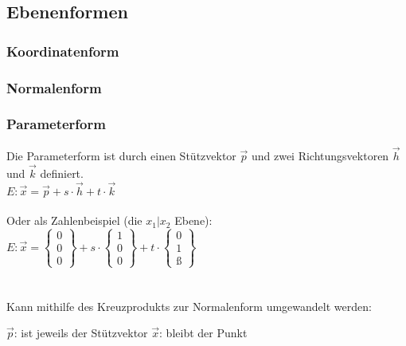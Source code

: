 \subsection{Ebenenformen}
\subsubsection{Koordinatenform}
\subsubsection{Normalenform}
\subsubsection{Parameterform}
Die Parameterform ist durch einen Stützvektor $\vec{p}$ und zwei Richtungsvektoren $\vec{h}$ und $\vec{k}$ definiert. \\
$
E: \vec{x} = \vec{p} + s\cdot\vec{h} + t\cdot\vec{k}
$
\\\\
Oder als Zahlenbeispiel (die $x_1 | x_2$ Ebene): \\
$
E: \vec{x} = 
\begin{Bmatrix}
    0 \\ 0 \\ 0
\end{Bmatrix}
 + s \cdot
\begin{Bmatrix}
    1 \\ 0 \\ 0
\end{Bmatrix}
 + t \cdot 
 \begin{Bmatrix}
    0 \\ 1 \\ ß
 \end{Bmatrix}
$
\\\\\\
Kann mithilfe des Kreuzprodukts zur Normalenform umgewandelt werden: \\
\begin{itemize}
    $\vec{p}$: ist jeweils der Stützvektor
    $\vec{x}$: bleibt der Punkt
\end{itemize}

